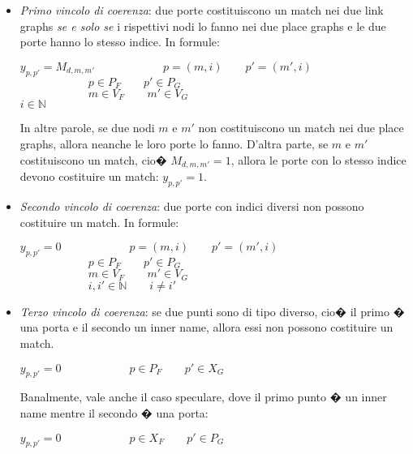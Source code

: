 \begin{itemize}
	\item
	\emph{Primo vincolo di coerenza}: due porte costituiscono un match nei due link graphs \emph{se e solo se} i rispettivi nodi lo fanno nei due place graphs e le due porte hanno lo stesso indice. In formule:
		\begin{center}
		$y_{p,p'} = M_{d,m,m'} \qquad \qquad \qquad p=(m,i) \qquad p'=(m',i) \qquad \qquad$ \\ 
		$\qquad \qquad \qquad p \in P_F \qquad p' \in P_G$ \\ 
		$\qquad \qquad \qquad m \in V_F \qquad m' \in V_G$ \\ 
		$i \in \mathbb{N}$ 
		\end{center}
	In altre parole, se due nodi $m$ e $m'$ non costituiscono un match nei due place graphs, allora neanche le loro porte lo fanno. D'altra parte, se $m$ e $m'$ costituiscono un match, cio� $M_{d,m,m'}=1$, allora le porte con lo stesso indice devono costituire un match: $y_{p,p'} = 1$.
	
	\item
	\emph{Secondo vincolo di coerenza}: due porte con indici diversi non possono costituire un match. In formule:
		\begin{center}
		$y_{p,p'} = 0 \qquad \qquad \qquad p=(m,i) \qquad p'=(m',i) \qquad $ \\ 
		$\qquad \qquad \qquad p \in P_F \qquad p' \in P_G$ \\ 
		$\qquad \qquad \qquad m \in V_F \qquad m' \in V_G$ \\ 
		$\qquad \qquad \qquad i, i' \in \mathbb{N} \qquad i \ne i'$ 
		\end{center}
	
	\item
	\emph{Terzo vincolo di coerenza}: se due punti sono di tipo diverso, cio� il primo � una porta e il secondo un inner name, allora essi non possono costituire un match.
		\begin{center}
		$y_{p,p'} = 0 \qquad \qquad \qquad p \in P_F \qquad p' \in X_G \qquad $ \\ 
		\end{center}
		Banalmente, vale anche il caso speculare, dove il primo punto � un inner name mentre il secondo � una porta:
		\begin{center}
		$y_{p,p'} = 0 \qquad \qquad \qquad p \in X_F \qquad p' \in P_G \qquad $ \\ 
		\end{center}
		

\end{itemize}
